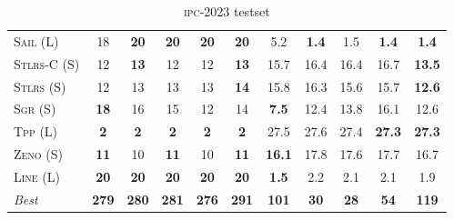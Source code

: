 \begin{table}[tb]
{\begin{tabular}{|l||ccccc||ccccc||}
\textsc{Sail} (L)&18&\textbf{20}&\textbf{20}&\textbf{20}&\textbf{20}&5.2&\textbf{1.4}&1.5&\textbf{1.4}&\textbf{1.4}\\
\textsc{Stlrs-C} (S)&12&\textbf{13}&12&12&\textbf{13}&15.7&16.4&16.4&16.7&\textbf{13.5}\\
\textsc{Stlrs} (S)&12&13&13&13&\textbf{14}&15.8&16.3&15.6&15.7&\textbf{12.6}\\
\textsc{Sgr} (S)&\textbf{18}&16&15&12&14&\textbf{7.5}&12.4&13.8&16.1&12.6\\
\textsc{Tpp} (L)&\textbf{2}&\textbf{2}&\textbf{2}&\textbf{2}&\textbf{2}&27.5&27.6&27.4&\textbf{27.3}&\textbf{27.3}\\
\textsc{Zeno} (S)&\textbf{11}&10&\textbf{11}&10&\textbf{11}&\textbf{16.1}&17.8&17.6&17.7&16.7\\
\textsc{Line} (L)&\textbf{20}&\textbf{20}&\textbf{20}&\textbf{20}&\textbf{20}&\textbf{1.5}&2.2&2.1&2.1&1.9
\\\hline
\textit{Best}&\textbf{279}&\textbf{280}&\textbf{281}&\textbf{276}&\textbf{291}&\textbf{101}&\textbf{30}&\textbf{28}&\textbf{54}&\textbf{119}\\\hline

        \end{tabular}}
        \caption{\textsc{ipc}-2023 testset}
        \label{tab:ipc}
        \end{table}
        